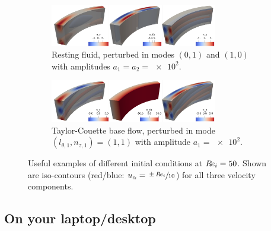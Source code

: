 \documentclass[a4paper, 11pt, DIV=11]{scrartcl}
\begin{document}
\begin{figure}
\vfill
\begin{subfigure}{1.0\textwidth}
\centering
\includegraphics[width=0.8\textwidth]{figures/tc0039/icPerturb01and10.png}
\caption{Resting fluid, perturbed in modes $(0,1)$ and  $(1,0)$
with amplitudes $a_{1}=a_{2}=\num{e2}$.}
\label{fig:tc0039icPerturb01and10}
\end{subfigure}
\vfill
\begin{subfigure}{1.0\textwidth}
\centering
\includegraphics[width=0.8\textwidth]{figures/tc0039/icPerturb22.png}
\caption{Taylor-Couette base flow, perturbed in mode
$(l_{\theta,1}, n_{z,1})=(1,1)$ with amplitude $a_{1}=\num{e2}$.}
\label{fig:tc0039icPerturb22}
\end{subfigure}
\caption{Useful examples of different initial conditions at $R\hspace{-0.1em}e_{i}=\num{50}$.
Shown are iso-contours (red/blue: $u_{\alpha}=\sfrac{\pm R\hspace{-0.1em}e_{i}}{10}$) for all
three velocity components.}
\label{fig:ic}
\end{figure}

\subsubsection{}

\subsection{On your laptop/desktop}
\label{sec:onYourLaptopDesktop}
\end{document}
